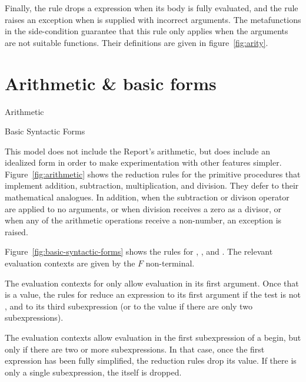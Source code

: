 Finally, the rule  drops a  expression
when its body is fully evaluated, and the rule 
raises an exception when  is supplied with
incorrect arguments.  The metafunctions in the side-condition
guarantee that this rule only applies when the arguments are not
suitable functions. Their definitions are given in
figure~\ref{fig:arity}.

\section{Arithmetic \& basic forms}

\beginfig
\begin{center}

\end{center}
\caption{Arithmetic}\label{fig:arithmetic}
\endfig

\beginfig
\begin{center}

\end{center}
\caption{Basic Syntactic Forms}\label{fig:basic-syntactic-forms}
\endfig

This model does not include the Report's arithmetic, but does include
an idealized form in order to make experimentation with other features
simpler. Figure~\ref{fig:arithmetic} shows the reduction rules for the
primitive procedures that implement addition, subtraction,
multiplication, and division. They defer to their mathematical
analogues. In addition, when the subtraction or divison operator are
applied to no arguments, or when division receives a zero as a
divisor, or when any of the arithmetic operations receive a
non-number, an exception is raised.

Figure~\ref{fig:basic-syntactic-forms} shows the rules for
, , and . The relevant
evaluation contexts are given by the $F$ non-terminal.

The evaluation contexts for  only allow evaluation in its
first argument. Once that is a value, the rules for  reduce
an  expression to its first argument if the test is not
\semfalse{}, and to its third subexpression (or to the value
 if there are only two subexpressions).

The  evaluation contexts allow evaluation in the first
subexpression of a begin, but only if there are two or more
subexpressions. In that case, once the first expression has been fully
simplified, the reduction rules drop its value. If there is only a
single subexpression, the  itself is dropped.

